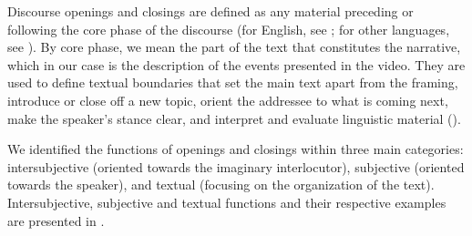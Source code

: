 \documentclass[output=paper,colorlinks,citecolor=brown]{langscibook}
\begin{document}
Discourse openings and closings are defined as any material preceding or following the core phase of the discourse (for English, see \cite{schlegloff1973, schleggloff1986, Schegloff2007}; for other languages, see \cite{Pavlidou2014, luke2002}). By core phase, we mean the part of the text that constitutes the narrative, which in our case is the description of the events presented in the video. They are used to define textual boundaries that set the main text apart from the framing, introduce or close off a new topic, orient the addressee to what is coming next, make the speaker’s stance clear, and interpret and evaluate linguistic material (\cite{labov1972, tolchinsky2002, berman2004}).

We identified the functions of openings and closings within three main categories: intersubjective (oriented towards the imaginary interlocutor), subjective (oriented towards the speaker), and textual (focusing on the organization of the text). Intersubjective, subjective and textual functions and their respective examples are presented in .
\end{document}
